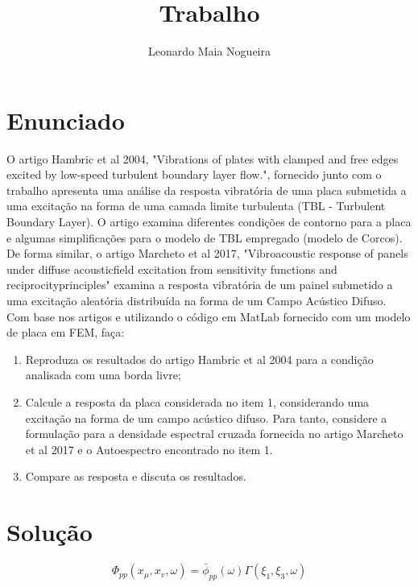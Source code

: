 \documentclass[9pt,a4paper,twoside]{rho-class/rho}
\title{Trabalho}
\author[1]{Leonardo Maia Nogueira}
\begin{document}
	
    \maketitle
    \thispagestyle{firststyle}


\section{Enunciado}
O artigo Hambric et al 2004, "Vibrations of plates with clamped and free edges excited by low-speed
turbulent boundary layer flow.", fornecido junto com o trabalho apresenta uma análise da resposta
vibratória de uma placa submetida a uma excitação na forma de uma camada limite turbulenta (TBL -
Turbulent Boundary Layer). O artigo examina diferentes condições de contorno para a placa e algumas
simplificações para o modelo de TBL empregado (modelo de Corcos).
De forma similar, o artigo Marcheto et al 2017, "Vibroacoustic response of panels under diffuse acousticfield excitation from sensitivity functions and reciprocityprinciples" examina a resposta vibratória de um painel submetido a uma excitação aleatória distribuída na forma de um Campo Acústico Difuso. Com base nos artigos e utilizando o código em MatLab fornecido com um modelo de placa em FEM, faça:

\begin{enumerate}
	\item  Reproduza os resultados do artigo Hambric et al 2004 para a condição analisada com uma borda livre;
	\item Calcule a resposta da placa considerada no item 1, considerando uma excitação na forma de um campo acústico difuso. Para tanto, considere a formulação para a densidade espectral cruzada fornecida no artigo Marcheto et al 2017 e o Autoespectro encontrado no item 1.
	\item Compare as resposta e discuta os resultados.
\end{enumerate}

\section{Solução}

\begin{equation}
	\Phi_{pp}(x_\mu,x_v,\omega)=\bar{\phi}_{pp}(\omega)\Gamma(\xi_1,\xi_3,\omega)
\end{equation}
\end{document}
